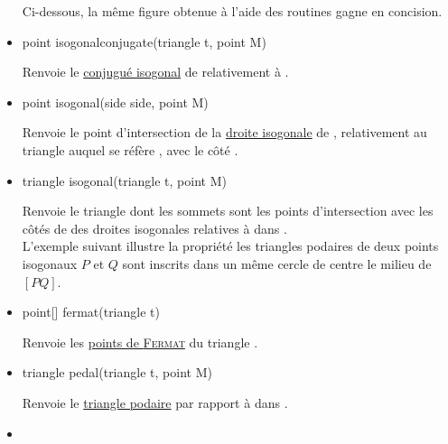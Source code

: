 \documentclass[pdftex]{article}
\begin{document}
\begin{itemize}
  Ci-dessous, la même figure obtenue à l'aide des routines
   gagne en concision.
\item {}
  \begin{Vcolor}
    point isogonalconjugate(triangle t, point M)
  \end{Vcolor}
  Renvoie le
  \href{http://fr.wikipedia.org/wiki/Conjugu\%C3\%A9_isogonal#Point_conjugu.C3.A9_isogonal}{conjugué
    isogonal} de  relativement à .
\item {}
  \begin{Vcolor}
    point isogonal(side side, point M)
  \end{Vcolor}
  Renvoie le point d'intersection de la
  \href{http://mathworld.wolfram.com/IsogonalLine.html}{droite
    isogonale} de , relativement au triangle auquel se
  réfère , avec le côté .
\item {}
  \begin{Vcolor}
    triangle isogonal(triangle t, point M)
  \end{Vcolor}
  Renvoie le triangle dont les sommets sont les points d'intersection
  avec les côtés de  des droites isogonales relatives
  à  dans .\\
  L'exemple suivant illustre la propriété \og{}les triangles podaires de
  deux points isogonaux $P$ et $Q$ sont inscrits dans un même cercle de
  centre le milieu de $[PQ]$\fg{}.
\item {}
  \begin{Vcolor}
    point[] fermat(triangle t)
  \end{Vcolor}
  Renvoie les
  \href{http://mathworld.wolfram.com/FermatPoints.html}{points de
    \textsc{Fermat}} du triangle .
\item {}
  \begin{Vcolor}
    triangle pedal(triangle t, point M)
  \end{Vcolor}
  Renvoie le
  \href{http://fr.wikipedia.org/wiki/Conjugu\%C3\%A9_isogonal#Triangle_podaire}{triangle
    podaire} par rapport à  dans .
\item {}
  \begin{Vcolor}

\end{Vcolor}
\end{itemize}
\end{document}
